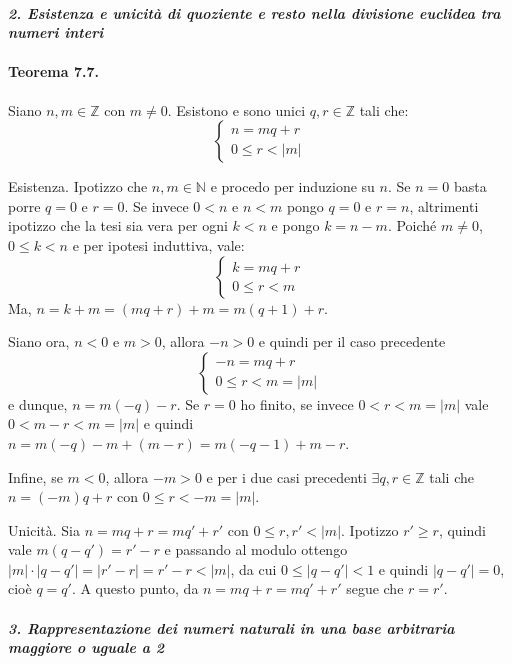 \documentclass[12pt, a4paper]{report}
\theoremstyle{definition}
\newcommand{\Z}{\mathbb{Z}}
\newcommand{\N}{\mathbb{N}}
\begin{document}
\paragraph{\emph{2. Esistenza e unicità di quoziente e resto nella divisione euclidea
tra numeri interi}}
\paragraph{Teorema 7.7.} Siano $n,m\in\Z$ con $m\neq 0$. Esistono e sono unici
$q,r\in\Z$ tali che:
\[\begin{cases}
    n=mq+r\\
    0\leq r<|m|
\end{cases}\]

\begin{demonstration}
    Esistenza.
    Ipotizzo che $n,m\in\N$ e procedo per induzione su $n$. Se $n=0$ basta
    porre $q=0$ e $r=0$. Se invece $0<n$ e $n<m$ pongo $q=0$ e $r=n$, altrimenti
    ipotizzo che la tesi sia vera per ogni $k<n$ e pongo $k=n-m$. Poiché $m\neq0$,
    $0\leq k<n$ e per ipotesi induttiva, vale:
    \[\begin{cases}
        k=mq+r\\
        0\leq r<m
    \end{cases}\]
    Ma, $n=k+m=(mq+r)+m=m(q+1)+r$.

    Siano ora, $n<0$ e $m>0$, allora $-n>0$ e quindi per il caso precedente
    \[\begin{cases}
        -n=mq+r\\
        0\leq r<m=|m|
    \end{cases}\]
    e dunque, $n=m(-q)-r$. Se $r=0$ ho finito, se invece $0<r<m=|m|$ vale
    $0<m-r<m=|m|$ e quindi $n=m(-q)-m+(m-r)=m(-q-1)+m-r$.

    Infine, se $m<0$, allora $-m>0$ e per i due casi precedenti $\exists q,r\in\Z$
    tali che $n=(-m)q+r$ con $0\leq r<-m=|m|$.

    Unicità. Sia $n=mq+r=mq'+r'$ con $0\leq r,r'<|m|$. Ipotizzo $r'\geq r$, quindi
    vale $m(q-q')=r'-r$ e passando al modulo ottengo $|m|\cdot|q-q'|=|r'-r|=r'-r<|m|$,
    da cui $0\leq |q-q'|<1$ e quindi $|q-q'|=0$, cioè $q=q'$. A questo punto, da
    $n=mq+r=mq'+r'$ segue che $r=r'$.
\end{demonstration}

\paragraph{\emph{3. Rappresentazione dei numeri naturali in una base arbitraria
maggiore o uguale a 2}}
\end{document}

